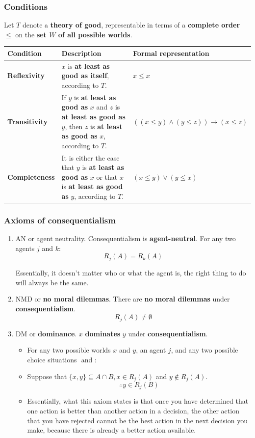 \documentclass[11pt]{article}
\begin{document}
\subsubsection{Conditions}
\label{sec:org92904e6}
Let \(T\) denote a \textbf{theory of good}, representable in terms of a \textbf{complete order} \(\le\) on the \textbf{set \(W\) of all possible worlds}.

\begin{center}
\begin{tabularx}{\textwidth}{|X|X|X|}
\hline
Condition & Description & Formal representation\\
\hline
\textbf{Reflexivity} & \(x\) is \textbf{at least as good as itself}, according to \(T\). & \(x \le x\)\\
\hline
\textbf{Transitivity} & If \(y\) is \textbf{at least as good as} \(x\) and \(z\) is \textbf{at least as good as} \(y\), then \(z\) is \textbf{at least as good as} \(x\), according to \(T\). & \(((x \le y) \wedge (y \le z)) \rightarrow (x \le z)\)\\
\hline
\textbf{Completeness} & It is either the case that \(y\) is \textbf{at least as good as} \(x\) or that \(x\) is \textbf{at least as good as} \(y\), according to \(T\). & \((x \le y) \vee (y \le x)\)\\
\hline
\end{tabularx}
\end{center}

 \newpage
\subsubsection{Axioms of consequentialism}
\label{sec:org1170474}
\begin{enumerate}
\item AN or agent neutrality. Consequentialism is \textbf{agent-neutral}.
For any two agents \(j\) and \(k\):
\[R_j (A) = R_k (A)\]

Essentially, it doesn't matter who or what the agent is, the right thing to do will always be the same.

\item NMD or \textbf{no moral dilemmas}. There are \textbf{no moral dilemmas} under \textbf{consequentialism}.
\[R_j (A) \ne \emptyset\]

\item DM or \textbf{dominance}. \(x\) \textbf{dominates} \(y\) under \textbf{consequentialism}.
\begin{itemize}
\item For any two possible worlds \(x\) and \(y\), an agent \(j\), and any two possible choice situations \(<j, A>\) and \(<j, B>\):
\item Suppose that \(\{x, y\} \subseteq A \cap B, x \in R_j (A)\) and \(y \notin R_j (A)\).
\[\therefore y \in R_j (B)\]
\item Essentially, what this axiom states is that once you have determined that one action is better than another action in a decision, the other action that you have rejected cannot be the best action in the next decision you make, because there is already a better action available.
\end{itemize}
\end{enumerate}
\end{document}

